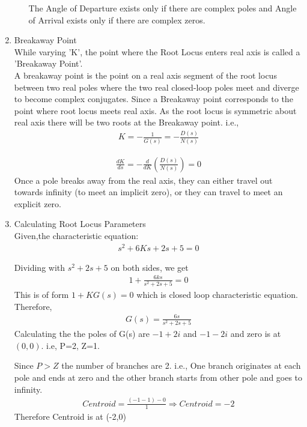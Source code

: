 \begin{enumerate}[label=\thesection.\arabic*.,ref=\thesection.\theenumi]
\begin{enumerate}
The Angle of Departure exists only if there are complex poles and Angle of Arrival exists only if there are complex zeros.
     \end{enumerate}
    
\item Breakaway Point \\
    While varying 'K', the point where the Root Locus enters real axis is called a 'Breakaway Point'. \\
A breakaway point is the point on a real axis segment of the root locus between two real poles where the two real closed-loop poles meet and diverge to become complex conjugates. Since a Breakaway point corresponds to the point where root locus meets real axis. As the root locus is symmetric about real axis there will be two roots at the Breakaway point. 
i.e.,
    \begin{align}
        K=-\frac{1}{G(s)}=-\frac{D(s)}{N(s)}    
    \end{align}

    \begin{align}
        \frac{d K}{d s}=-\frac{d}{d K}\left(\frac{D(s)}{N(s)}\right)=0 
    \end{align}
    Once a pole breaks away from the real axis, they can either travel out towards infinity (to meet an implicit zero), or they can travel to meet an explicit zero. 



    
\item Calculating Root Locus Parameters\\
Given,the characteristic equation:
\begin{align}
    s^2 + 6Ks + 2s + 5 = 0    
\end{align}
    
Dividing with $s^2 + 2s + 5$ on both sides, we get
\begin{align}
    1+\frac{6 k s}{s^{2}+2 s+5}=0    
\end{align}
This is of form $1+KG(s)=0$ which is closed loop characteristic equation. Therefore,
\begin{align}
G(s) = \frac{6 s}{s^{2}+2 s+5}
\end{align}
Calculating the the poles of G(s) are $-1+2i$ and $-1-2i$ and zero is at $(0,0)$. i.e, P=2, Z=1.

Since $P>Z$ the number of branches are 2. i.e., One branch originates at each pole and ends at zero and the other branch starts from other pole and goes to infinity.
\begin{align}
Centroid = \frac{(-1-1)-0}{1} \Rightarrow Centroid= -2
\end{align}
 Therefore Centroid is at (-2,0)


\end{enumerate}
